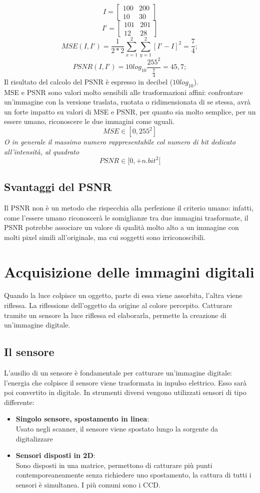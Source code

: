 \documentclass{report}
\begin{document}
$$
I =
\begin{bmatrix}
	100 & 200 \\
	10  & 30  
\end{bmatrix}
$$
$$
I' =
\begin{bmatrix}
	101 & 201 \\
	12  & 28  
\end{bmatrix}
$$
$$
MSE(I, I') = \frac{1}{2*2}\sum^2_{x=1}\sum^2_{y=1}[I' - I]^2 = \frac{7}{4};
$$
$$
PSNR(I, I') = 10log_{10}\frac{255^2}{\frac{7}{4}} = 45,7;
$$
Il risultato del calcolo del PSNR è espresso in decibel ($10log_{10}$).\\
MSE e PSNR sono valori molto sensibili alle trasformazioni affini: confrontare un'immagine con la versione traslata, ruotata o ridimensionata di se stessa, avrà un forte impatto su valori di MSE e PSNR, per quanto sia molto semplice, per un essere umano, riconoscere le due immagini come uguali.
$$
MSE \in [0, 255^2] 
$$
\textit{O in generale il massimo numero rappresentabile col numero di bit dedicato all'intensità, al quadrato}
$$
PSNR \in [0, +n.bit^2[
	$$
		
	\section{Svantaggi del PSNR}
	Il PSNR non è un metodo che rispecchia alla perfezione il criterio umano: infatti, come l'essere umano riconoscerà le somiglianze tra due immagini trasformate, il PSNR potrebbe associare un valore di qualità molto alto a un immagine con molti pixel simili all'originale, ma cui soggetti sono irriconoscibili.
		
	\newpage
	\chapter{Acquisizione delle immagini digitali}
	Quando la luce colpisce un oggetto, parte di essa viene assorbita, l'altra viene riflessa. La riflessione dell'oggetto da origine al colore percepito. Catturare tramite un sensore la luce riflessa ed elaborarla, permette la creazione di un'immagine digitale.
		
	\section{Il sensore}
	L'ausilio di un sensore è fondamentale per catturare un'immagine digitale:\\
	l'energia che colpisce il sensore viene trasformata in inpulso elettrico. Esso sarà poi convertito in digitale.
	In strumenti diversi vengono utilizzati sensori di tipo differente:
	\begin{itemize}
		\item \textbf{Singolo sensore, spostamento in linea}:\\
		      Usato negli scanner, il sensore viene spostato lungo la sorgente da digitalizzare
		\item \textbf{Sensori disposti in 2D}:\\
		      Sono disposti in una matrice, permettono di catturare più punti contemporeaneamente senza richiedere uno spostamento, la cattura di tutti i sensori è simultanea. I più comuni sono i CCD.
	\end{itemize}
\end{document}
